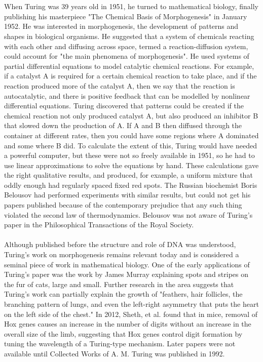 \documentclass{article}
\begin{document}
\\\\
When Turing was 39 years old in 1951, he turned to mathematical biology, finally publishing his masterpiece "The Chemical Basis of Morphogenesis" in January 1952. He was interested in morphogenesis, the development of patterns and shapes in biological organisms. He suggested that a system of chemicals reacting with each other and diffusing across space, termed a reaction-diffusion system, could account for "the main phenomena of morphogenesis". He used systems of partial differential equations to model catalytic chemical reactions. For example, if a catalyst A is required for a certain chemical reaction to take place, and if the reaction produced more of the catalyst A, then we say that the reaction is autocatalytic, and there is positive feedback that can be modelled by nonlinear differential equations. Turing discovered that patterns could be created if the chemical reaction not only produced catalyst A, but also produced an inhibitor B that slowed down the production of A. If A and B then diffused through the container at different rates, then you could have some regions where A dominated and some where B did. To calculate the extent of this, Turing would have needed a powerful computer, but these were not so freely available in 1951, so he had to use linear approximations to solve the equations by hand. These calculations gave the right qualitative results, and produced, for example, a uniform mixture that oddly enough had regularly spaced fixed red spots. The Russian biochemist Boris Belousov had performed experiments with similar results, but could not get his papers published because of the contemporary prejudice that any such thing violated the second law of thermodynamics. Belousov was not aware of Turing's paper in the Philosophical Transactions of the Royal Society.
\\\\
Although published before the structure and role of DNA was understood, Turing's work on morphogenesis remains relevant today and is considered a seminal piece of work in mathematical biology. One of the early applications of Turing's paper was the work by James Murray explaining spots and stripes on the fur of cats, large and small. Further research in the area suggests that Turing's work can partially explain the growth of "feathers, hair follicles, the branching pattern of lungs, and even the left-right asymmetry that puts the heart on the left side of the chest." In 2012, Sheth, et al. found that in mice, removal of Hox genes causes an increase in the number of digits without an increase in the overall size of the limb, suggesting that Hox genes control digit formation by tuning the wavelength of a Turing-type mechanism. Later papers were not available until Collected Works of A. M. Turing was published in 1992.
\end{document}
